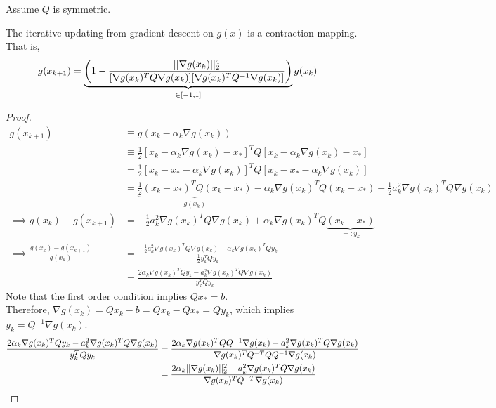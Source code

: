 \documentclass{article}
\begin{document}
	\begin{assumption}
		Assume $Q$ is symmetric.
	\end{assumption}
	
	\begin{lemma}
		The iterative updating from gradient descent on $g(x)$ is a contraction mapping. That is,
		\begin{align}
			g(x_{k+1}) &= \underbrace{\left(1 - \frac{\vert \vert {\nabla g(x_k)} \vert \vert_2^4}{[\nabla g(x_k)^T Q \nabla g(x_k)][\nabla g(x_k)^T Q^{-1} \nabla g(x_k)]} \right)}_{\in [-1, 1]} g(x_k)
		\end{align}
	\end{lemma}
	\begin{proof}
		\begin{align}
			g(x_{k+1}) &\equiv g(x_k - \alpha_k \nabla g(x_k)) \\
			&\equiv \frac{1}{2} [x_k - \alpha_k \nabla g(x_k) - x_*]^T Q [x_k - \alpha_k \nabla g(x_k) - x_*] \\
			&= \frac{1}{2} [x_k - x_* - \alpha_k \nabla g(x_k)]^T Q [x_k - x_* - \alpha_k \nabla g(x_k)] \\
			&= \underbrace{\frac{1}{2} (x_k - x_*)^T Q (x_k - x_*)}_{g(x_k)} - \alpha_k \nabla g(x_k)^T Q (x_k - x_*) + \frac{1}{2} a_k^2 \nabla g(x_k)^T Q \nabla g(x_k) \\
			\implies g(x_k) - g(x_{k+1}) &= - \frac{1}{2} a_k^2 \nabla g(x_k)^T Q \nabla g(x_k) + \alpha_k \nabla g(x_k)^T Q \underbrace{(x_k - x_*)}_{=:y_k} \\
			\implies \frac{g(x_k) - g(x_{k+1})}{g(x_k)} &= \frac{- \frac{1}{2} a_k^2 \nabla g(x_k)^T Q \nabla g(x_k) + \alpha_k \nabla g(x_k)^T Q y_k}{\frac{1}{2} y_k^T Q y_k} \\
			&= \frac{2 \alpha_k \nabla g(x_k)^T Q y_k - a_k^2 \nabla g(x_k)^T Q \nabla g(x_k)}{y_k^T Q y_k}
		\end{align}
		Note that the first order condition implies $Qx_* = b$. \\
		Therefore, $\nabla g(x_k) = Qx_k - b = Q x_k - Qx_* = Qy_k$, which implies $y_k = Q^{-1} \nabla g(x_k)$.
		\begin{align}
			\frac{2 \alpha_k \nabla g(x_k)^T Q y_k - a_k^2 \nabla g(x_k)^T Q \nabla g(x_k)}{y_k^T Q y_k}
			&= \frac{2 \alpha_k \nabla g(x_k)^T Q Q^{-1}\nabla g(x_k) - a_k^2 \nabla g(x_k)^T Q \nabla g(x_k)}{\nabla g(x_k)^T Q^{-T} Q Q^{-1} \nabla g(x_k)} \\
			&= \frac{2 \alpha_k \norm{\nabla g(x_k)}_2^2 - a_k^2 \nabla g(x_k)^T Q \nabla g(x_k)}{\nabla g(x_k)^T Q^{-T} \nabla g(x_k)}

\end{align}
\end{proof}
\end{document}
